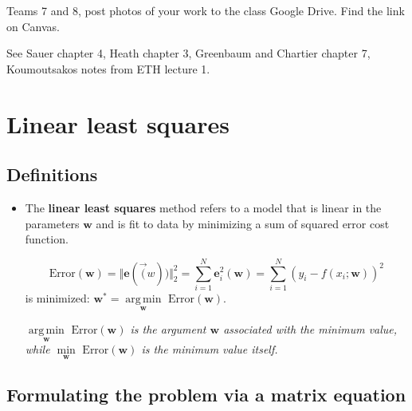 \documentclass[12pt,letterpaper,noanswers]{exam}
\newcommand{\vc}[1]{\boldsymbol{#1}}
\DeclareMathOperator*{\argmin}{arg\,min} %
\begin{document}
Teams 7 and 8, post photos of your work to the class Google Drive.  Find the link on Canvas.

\noindent See Sauer chapter 4, Heath chapter 3, Greenbaum and Chartier chapter 7, Koumoutsakos notes from ETH lecture 1.


\section{Linear least squares}

\subsection{Definitions}
\begin{tcolorbox}
\begin{itemize}
\itemsep0pt
 
    \item The \textbf{linear least squares} method refers to a model that is linear in the parameters $\vc{w}$ and is fit to data by minimizing a sum of squared error cost function.
    
    \[\text{Error}(\vc{w}) = \Vert \vc{e}(\vec(w))\Vert_2^2 = \sum\limits_{i=1}^N \vc{e}_i^2(\vc{w}) = \sum\limits_{i=1}^N \left(y_i - f(x_i; \vc{w})\right)^2\] is minimized: $\vc{w}^* = \argmin\limits_{\vc{w}} \text{ Error}(\vc{w}).$
    
    \emph{$\argmin\limits_{\vc{w}} \text{ Error}(\vc{w})$ is the argument $\vc{w}$ associated with the minimum value, while $\min\limits_{\vc{w}} \text{ Error}(\vc{w})$ is the minimum value itself.}
\end{itemize}

\end{tcolorbox}

\subsection{Formulating the problem via a matrix equation}
\end{document}
